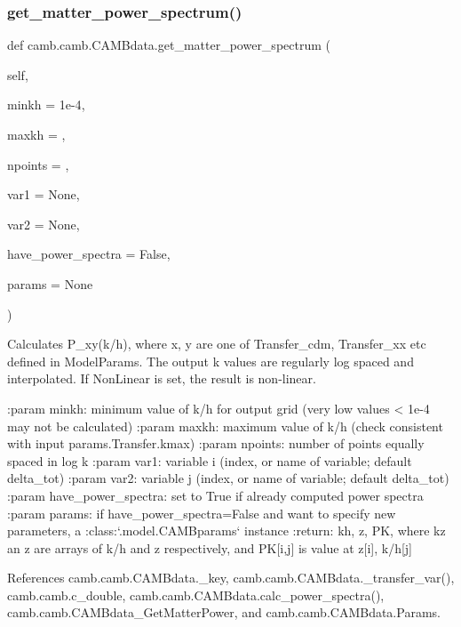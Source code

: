 \subsubsection{\texorpdfstring{get\+\_\+matter\+\_\+power\+\_\+spectrum()}{get\_matter\_power\_spectrum()}}
{\footnotesize\ttfamily def camb.\+camb.\+C\+A\+M\+Bdata.\+get\+\_\+matter\+\_\+power\+\_\+spectrum (\begin{DoxyParamCaption}\item[{}]{self,  }\item[{}]{minkh = {\ttfamily 1e-\/4},  }\item[{}]{maxkh = {},  }\item[{}]{npoints = {},  }\item[{}]{var1 = {\ttfamily None},  }\item[{}]{var2 = {\ttfamily None},  }\item[{}]{have\+\_\+power\+\_\+spectra = {\ttfamily False},  }\item[{}]{params = {\ttfamily None} }\end{DoxyParamCaption})}

\begin{DoxyVerb}Calculates P_{xy}(k/h), where x, y are one of Transfer_cdm, Transfer_xx etc defined in ModelParams.
The output k values are regularly log spaced and interpolated. If NonLinear is set, the result is non-linear.

:param minkh: minimum value of k/h for output grid (very low values < 1e-4 may not be calculated)
:param maxkh: maximum value of k/h (check consistent with input params.Transfer.kmax)
:param npoints: number of points equally spaced in log k
:param var1: variable i (index, or name of variable; default delta_tot)
:param var2: variable j (index, or name of variable; default delta_tot)
:param have_power_spectra: set to True if already computed power spectra
:param params: if have_power_spectra=False and want to specify new parameters, a :class:`.model.CAMBparams` instance
:return: kh, z, PK, where kz an z are arrays of k/h and z respectively, and PK[i,j] is value at z[i], k/h[j]
\end{DoxyVerb}
 

References camb.\+camb.\+C\+A\+M\+Bdata.\+\_\+key, camb.\+camb.\+C\+A\+M\+Bdata.\+\_\+transfer\+\_\+var(), camb.\+camb.\+c\+\_\+double, camb.\+camb.\+C\+A\+M\+Bdata.\+calc\+\_\+power\+\_\+spectra(), camb.\+camb.\+C\+A\+M\+Bdata\+\_\+\+Get\+Matter\+Power, and camb.\+camb.\+C\+A\+M\+Bdata.\+Params.



